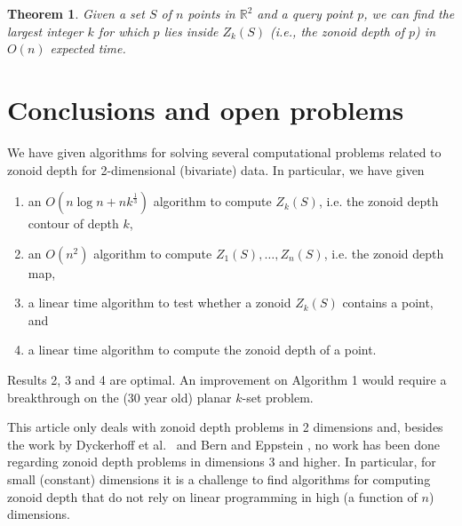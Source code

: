 \documentclass{elsart}
\newtheorem{theorem}{Theorem}
\begin{document}
\begin{theorem}\label{theorem_final}
Given a set $S$ of $n$ points in $\mathbb{R}^2$ and a query point $p$,
we can find the largest integer $k$ for which $p$ lies inside $Z_k(S)$
(i.e., the zonoid depth of $p$) in $O(n)$ expected time. 
\end{theorem}

\section{Conclusions and open problems}\label{section_conclusions_and_open_problems}

We have given algorithms for solving several computational problems
related to zonoid depth for 2-dimensional (bivariate) data.
In particular,  we have given 

\begin{enumerate}
\item an $O(n\log n+nk^{\frac{1}{3}})$ algorithm to compute $Z_k(S)$, i.e. the zonoid depth contour of depth $k$,	
\item an $O(n^2)$ algorithm to compute $Z_1(S),\ldots,Z_n(S)$, i.e. the zonoid depth map,
\item a linear time algorithm to test whether a zonoid $Z_k(S)$ contains a point, and
\item a linear time algorithm to compute the zonoid depth of a point.
\end{enumerate}
Results 2, 3 and 4 are optimal. An improvement on Algorithm 1 would require a breakthrough on the (30 year old) planar $k$-set problem. 

This article only deals with zonoid depth problems in 2 dimensions
and, besides the work by Dyckerhoff et al.\
\cite{zonoid_data_depth_theory_and_computation} and Bern and Eppstein
\cite{bern-eppstein-01}, no work has been done regarding zonoid depth
problems in dimensions 3 and higher.  In particular, for small
(constant)
dimensions it is a challenge to find algorithms for computing zonoid
depth that do not rely on linear programming in high (a function of
$n$) dimensions.



\end{document}
